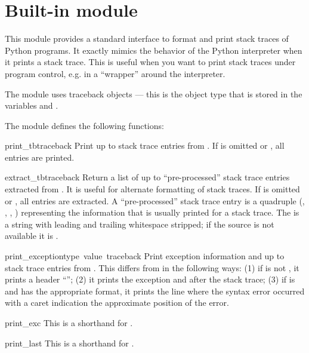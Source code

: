 \section{Built-in module }

\renewcommand{\indexsubitem}{(in module traceback)}

This module provides a standard interface to format and print stack
traces of Python programs.  It exactly mimics the behavior of the
Python interpreter when it prints a stack trace.  This is useful when
you want to print stack traces under program control, e.g. in a
``wrapper'' around the interpreter.

The module uses traceback objects --- this is the object type
that is stored in the variables  and
.

The module defines the following functions:

\begin{funcdesc}{print_tb}{traceback}
Print up to  stack trace entries from .  If
 is omitted or , all entries are printed.
\end{funcdesc}

\begin{funcdesc}{extract_tb}{traceback}
Return a list of up to  ``pre-processed'' stack trace
entries extracted from .  It is useful for alternate
formatting of stack traces.  If  is omitted or ,
all entries are extracted.  A ``pre-processed'' stack trace entry is a
quadruple (, , ,
) representing the information that is usually printed
for a stack trace.  The  is a string with leading and
trailing whitespace stripped; if the source is not available it is
.
\end{funcdesc}

\begin{funcdesc}{print_exception}{type\, value\, traceback}
Print exception information and up to  stack trace entries
from .  This differs from  in the
following ways: (1) if  is not , it prints a
header ``''; (2) it prints the
exception  and  after the stack trace; (3) if
 is  and  has the appropriate
format, it prints the line where the syntax error occurred with a
caret indication the approximate position of the error.
\end{funcdesc}

\begin{funcdesc}{print_exc}{}
This is a shorthand for 
  .
\end{funcdesc}

\begin{funcdesc}{print_last}{}
This is a shorthand for 
  .
\end{funcdesc}
